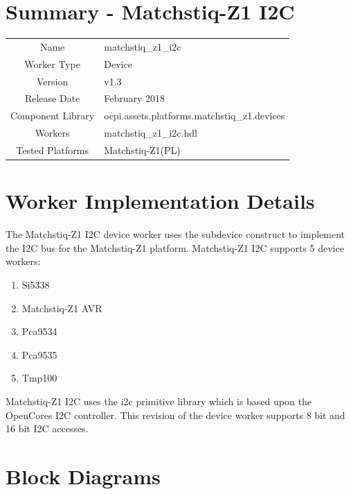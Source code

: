 \documentclass{article}
\author{} %
\date{Version \docVersion} %
\title{\docTitle}
\def\docVersion{1.3}
\def\comp{matchstiq\_z1\_i2c}
\def\Comp{Matchstiq-Z1 I2C}
\begin{document}
\section*{Summary - \Comp}
\begin{tabular}{|c|M{13.5cm}|}
	\hline
	                  &                                        \\
	\hline
	Name              & \comp                                  \\
	\hline
	Worker Type       & Device                                 \\
	\hline
	Version           & v\docVersion \\
	\hline
	Release Date      & February 2018 \\
	\hline
	Component Library & ocpi.assets.platforms.matchstiq\_z1.devices \\
	\hline
	Workers           & \comp.hdl                              \\
	\hline
	Tested Platforms  & Matchstiq-Z1(PL)                       \\
	\hline
\end{tabular}

\section*{Worker Implementation Details}
The Matchstiq-Z1 I2C device worker uses the subdevice construct to implement the I2C bus for the Matchstiq-Z1 platform. Matchstiq-Z1 I2C supports 5 device workers:
\begin{enumerate}
	\item Si5338
	\item Matchstiq-Z1 AVR
	\item Pca9534
	\item Pca9535
	\item Tmp100
\end{enumerate}
Matchstiq-Z1 I2C uses the i2c primitive library which is based upon the OpenCores I2C controller. This revision of the device worker supports 8 bit and 16 bit I2C accesses.

\section*{Block Diagrams}
\end{document}
